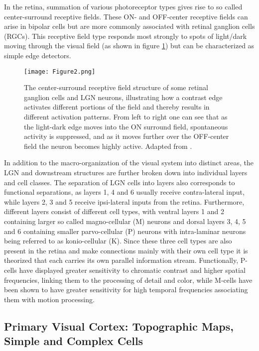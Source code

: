 In the retina, summation of various photoreceptor types gives rise to
so called center-surround receptive fields. These ON- and OFF-center
receptive fields can arise in bipolar cells but are more commonly
associated with retinal ganglion cells (RGCs). This receptive field
type responds most strongly to spots of light/dark moving through the
visual field (as shown in figure \ref{Center-Surround}) but can be
characterized as simple edge detectors.

\begin{figure}
	\centering \texttt{[image: Figure2.png]}
	\caption[A Center-surround receptive field. Adapted from
      \cite{Bear2006}.]{The center-surround receptive field structure
      of some retinal ganglion cells and LGN neurons, illustrating how
      a contrast edge activates different portions of the field and
      thereby results in different activation patterns. From left to
      right one can see that as the light-dark edge moves into the ON
      surround field, spontaneous activity is suppressed, and as it
      moves further over the OFF-center field the neuron becomes
      highly active. Adapted from \cite{Bear2006}.}
	\label{Center-Surround}
\end{figure}

In addition to the macro-organization of the visual system into
distinct areas, the LGN and downstream structures are further
broken down into individual layers and cell classes. The separation of
LGN cells into layers also corresponds to functional separations, as
layers 1, 4 and 6 usually receive contra-lateral input, while layers
2, 3 and 5 receive ipsi-lateral inputs from the retina. Furthermore,
different layers consist of different cell types, with ventral layers
1 and 2 containing larger so called magno-cellular (M) neurons and
dorsal layers 3, 4, 5 and 6 containing smaller parvo-cellular (P)
neurons with intra-laminar neurons being referred to as konio-cellular
(K). Since these three cell types are also present in the retina and
make connections mainly with their own cell type it is theorized that
each carries its own parallel information stream. Functionally,
P-cells have displayed greater sensitivity to chromatic contrast and
higher spatial frequencies, linking them to the processing of detail
and color, while M-cells have been shown to have greater sensitivity
for high temporal frequencies associating them with motion processing.

\subsection{Primary Visual Cortex: Topographic Maps, Simple and Complex Cells}

